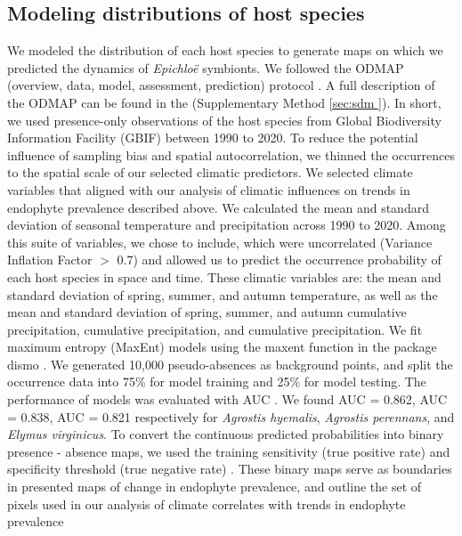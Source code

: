 \documentclass[11pt]{article}
\newcommand{\josh}[2]{{\color{orange}{#1}}\footnote{\textit{\color{orange}{#2}}}}
\begin{document}
\subsection*{Modeling distributions of host species}
We modeled the distribution of each host species to generate maps on which we predicted the dynamics of \emph{Epichloë} symbionts.
We followed the ODMAP (overview, data, model, assessment, prediction) protocol \citep{crossley2022opposing}.
A full description of the ODMAP can be found in the  (Supplementary Method \ref{sec:sdm }). 
 In short, we used presence-only observations of the host species from Global Biodiversity Information Facility (GBIF) between 1990 to 2020.
To reduce the potential influence of sampling bias and spatial autocorrelation, we thinned the occurrences to the spatial scale  of our selected climatic predictors. 
We selected climate variables that aligned with our analysis of climatic influences on trends in endophyte prevalence described above.
We calculated the mean and standard deviation of seasonal temperature and precipitation across 1990 to 2020. 
Among this suite of variables, we chose to include, which were uncorrelated (Variance Inflation Factor $>$ 0.7) and allowed us to predict the occurrence probability of each host species in space and time.
These climatic variables are: the mean and standard deviation of spring, summer, and autumn temperature, as well as the mean and standard deviation of spring, summer, and autumn cumulative precipitation, cumulative precipitation, and cumulative precipitation.
We fit maximum entropy (MaxEnt) models using the maxent function in the package dismo \citep{hijmans2017package}. 
We generated 10,000 pseudo-absences as background points, and split the occurrence data into 75\% for model training and 25\% for model testing.
The performance of models was evaluated with AUC \citep{jimenez2012insights}. 
We found AUC = 0.862, AUC = 0.838, AUC = 0.821 respectively  for \emph{Agrostis hyemalis}, \emph{Agrostis perennans}, and \emph{Elymus virginicus}.
To convert the continuous predicted probabilities into binary presence - absence maps, we used the  training sensitivity (true positive rate) and specificity threshold (true negative rate) \citep{liu2005selecting}. 
These binary maps serve as boundaries in presented maps of change in endophyte prevalence, and outline the set of pixels used in our analysis of climate correlates with trends in endophyte prevalence
		
\end{document}
